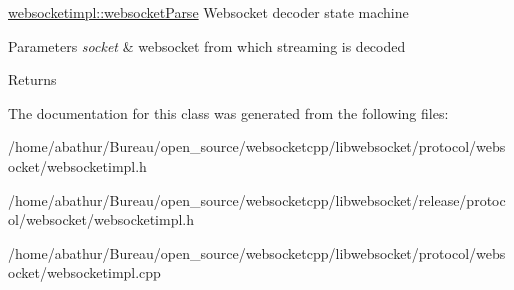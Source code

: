 \hyperlink{classwebsocketimpl_ae5ae4cafabbff7ed2fab292e4ed1daf3}{websocketimpl\-::websocket\-Parse} Websocket decoder state machine 


\begin{DoxyParams}{Parameters}
{\em socket} & websocket from which streaming is decoded \\
\hline
\end{DoxyParams}
\begin{DoxyReturn}{Returns}

\end{DoxyReturn}


The documentation for this class was generated from the following files\-:\begin{DoxyCompactItemize}
\item 
/home/abathur/\-Bureau/open\-\_\-source/websocketcpp/libwebsocket/protocol/websocket/websocketimpl.\-h\item 
/home/abathur/\-Bureau/open\-\_\-source/websocketcpp/libwebsocket/release/protocol/websocket/websocketimpl.\-h\item 
/home/abathur/\-Bureau/open\-\_\-source/websocketcpp/libwebsocket/protocol/websocket/websocketimpl.\-cpp\end{DoxyCompactItemize}
